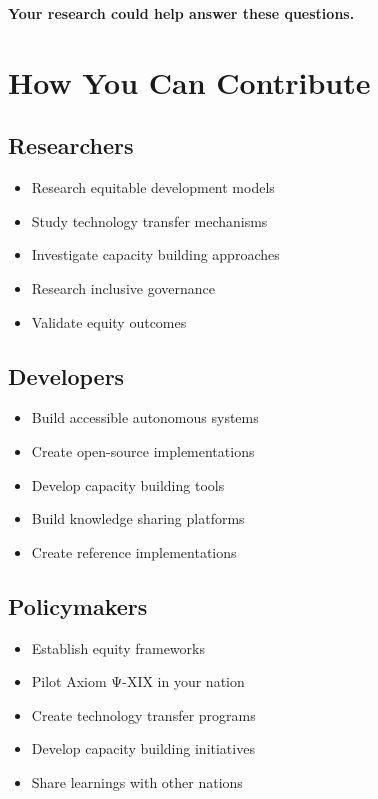 \textbf{Your research could help answer these questions.}

\vspace{0.5cm}

\section{How You Can Contribute}

\subsection{Researchers}

\begin{itemize}
    \item Research equitable development models
    \item Study technology transfer mechanisms
    \item Investigate capacity building approaches
    \item Research inclusive governance
    \item Validate equity outcomes
\end{itemize}

\subsection{Developers}

\begin{itemize}
    \item Build accessible autonomous systems
    \item Create open-source implementations
    \item Develop capacity building tools
    \item Build knowledge sharing platforms
    \item Create reference implementations
\end{itemize}

\subsection{Policymakers}

\begin{itemize}
    \item Establish equity frameworks
    \item Pilot Axiom Ψ-XIX in your nation
    \item Create technology transfer programs
    \item Develop capacity building initiatives
    \item Share learnings with other nations
\end{itemize}


